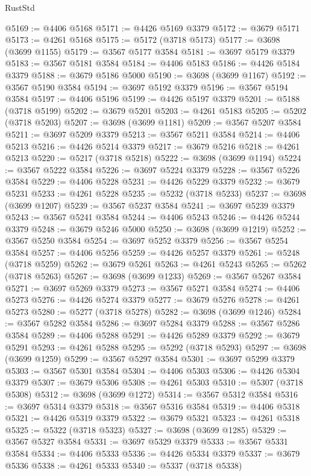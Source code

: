 \begin{lexlean}{RustStd}
\begin{coremodule}
@5169 := @4406 @5168
@5171 := @4426 @5169 @3379
@5172 := @3679 @5171
@5173 := @4261 @5168
@5175 := @5172 (@3718 @5173)
@5177 := @3698 (@3699 @1155)
@5179 := @3567 @5177 @3584
@5181 := @3697 @5179 @3379
@5183 := @3567 @5181 @3584
@5184 := @4406 @5183
@5186 := @4426 @5184 @3379
@5188 := @3679 @5186 @5000
@5190 := @3698 (@3699 @1167)
@5192 := @3567 @5190 @3584
@5194 := @3697 @5192 @3379
@5196 := @3567 @5194 @3584
@5197 := @4406 @5196
@5199 := @4426 @5197 @3379
@5201 := @5188 (@3718 @5199)
@5202 := @3679 @5201
@5203 := @4261 @5183
@5205 := @5202 (@3718 @5203)
@5207 := @3698 (@3699 @1181)
@5209 := @3567 @5207 @3584
@5211 := @3697 @5209 @3379
@5213 := @3567 @5211 @3584
@5214 := @4406 @5213
@5216 := @4426 @5214 @3379
@5217 := @3679 @5216
@5218 := @4261 @5213
@5220 := @5217 (@3718 @5218)
@5222 := @3698 (@3699 @1194)
@5224 := @3567 @5222 @3584
@5226 := @3697 @5224 @3379
@5228 := @3567 @5226 @3584
@5229 := @4406 @5228
@5231 := @4426 @5229 @3379
@5232 := @3679 @5231
@5233 := @4261 @5228
@5235 := @5232 (@3718 @5233)
@5237 := @3698 (@3699 @1207)
@5239 := @3567 @5237 @3584
@5241 := @3697 @5239 @3379
@5243 := @3567 @5241 @3584
@5244 := @4406 @5243
@5246 := @4426 @5244 @3379
@5248 := @3679 @5246 @5000
@5250 := @3698 (@3699 @1219)
@5252 := @3567 @5250 @3584
@5254 := @3697 @5252 @3379
@5256 := @3567 @5254 @3584
@5257 := @4406 @5256
@5259 := @4426 @5257 @3379
@5261 := @5248 (@3718 @5259)
@5262 := @3679 @5261
@5263 := @4261 @5243
@5265 := @5262 (@3718 @5263)
@5267 := @3698 (@3699 @1233)
@5269 := @3567 @5267 @3584
@5271 := @3697 @5269 @3379
@5273 := @3567 @5271 @3584
@5274 := @4406 @5273
@5276 := @4426 @5274 @3379
@5277 := @3679 @5276
@5278 := @4261 @5273
@5280 := @5277 (@3718 @5278)
@5282 := @3698 (@3699 @1246)
@5284 := @3567 @5282 @3584
@5286 := @3697 @5284 @3379
@5288 := @3567 @5286 @3584
@5289 := @4406 @5288
@5291 := @4426 @5289 @3379
@5292 := @3679 @5291
@5293 := @4261 @5288
@5295 := @5292 (@3718 @5293)
@5297 := @3698 (@3699 @1259)
@5299 := @3567 @5297 @3584
@5301 := @3697 @5299 @3379
@5303 := @3567 @5301 @3584
@5304 := @4406 @5303
@5306 := @4426 @5304 @3379
@5307 := @3679 @5306
@5308 := @4261 @5303
@5310 := @5307 (@3718 @5308)
@5312 := @3698 (@3699 @1272)
@5314 := @3567 @5312 @3584
@5316 := @3697 @5314 @3379
@5318 := @3567 @5316 @3584
@5319 := @4406 @5318
@5321 := @4426 @5319 @3379
@5322 := @3679 @5321
@5323 := @4261 @5318
@5325 := @5322 (@3718 @5323)
@5327 := @3698 (@3699 @1285)
@5329 := @3567 @5327 @3584
@5331 := @3697 @5329 @3379
@5333 := @3567 @5331 @3584
@5334 := @4406 @5333
@5336 := @4426 @5334 @3379
@5337 := @3679 @5336
@5338 := @4261 @5333
@5340 := @5337 (@3718 @5338)

\end{coremodule}
\end{lexlean}
